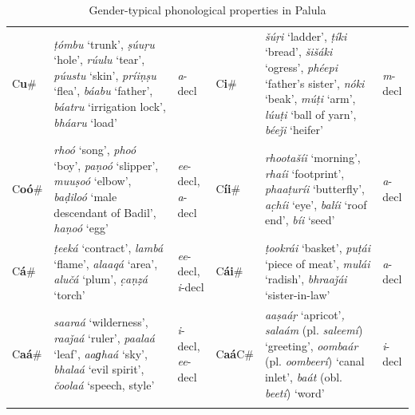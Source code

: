 \documentclass[output=collectionpaper]{langsci/langscibook}
\begin{document}
\begin{table}[htb]
\begin{tabularx}{\textwidth}{p{1cm}>{\raggedright\let\newline\\\arraybackslash\hspace{0pt}}Xp{1cm}p{1cm}>{\raggedright\let\newline\\\arraybackslash\hspace{0pt}}Xp{1cm}}
\lsptoprule
\multicolumn{3}{X}{Masculine} & \multicolumn{3}{X}{Feminine}\\
\midrule
C\textbf{u}\# & \textit{ṭómbu} `trunk', \textit{ṣúuṛu} `hole', \textit{rúulu} `tear', \textit{púustu} `skin', \textit{príiṇṣu} `flea', \textit{báabu} `father', \textit{báatru} `irrigation lock', \textit{bháaru} `load' & \textit{a}{}-decl & C\textbf{i}\# & \textit{šúṛi} `ladder', \textit{ṭíki} `bread', \textit{šišáki} `ogress', \textit{phéepi} `father's sister', \textit{nóki} `beak', \textit{múṭi} `arm', \textit{lúuṭi} `ball of yarn', \textit{béeǰi} `heifer' & \textit{m}{}-decl\\
C\textbf{oó}\# & \textit{rhoó} `song', \textit{phoó} `boy', \textit{paṇoó} `slipper', \textit{muuṣoó} `elbow', \textit{baḍiloó} `male descendant of Badil', \textit{haṇoó} `egg' & \textit{ee}{}-decl, \textit{a}{}-decl & C\textbf{íi}\# & \textit{rhootašíi} `morning', \textit{rhaíi} `footprint', \textit{phaaṭuríi} `butterfly', \textit{ac̣híi} `eye', \textit{balíi} `roof end', \textit{bíi} `seed' & \textit{a}{}-decl\\
C\textbf{á}\# & \textit{ṭeeká} `contract', \textit{lambá} `flame', \textit{alaaqá} `area', \textit{alučá} `plum', \textit{c̣aṇẓá} `torch' & \textit{ee}{}-decl, \textit{i}{}-decl & C\textbf{á}\textbf{i}\# & \textit{ṭookrái} `basket', \textit{puṭái} `piece of meat', \textit{mulái} `radish', \textit{bhraaǰái} `sister-in-law' & \textit{a}{}-decl\\
C\textbf{aá}\# & \textit{saaraá} `wilderness', \textit{raaǰaá} `ruler', \textit{paalaá} `leaf', \textit{aaɡhaá} `sky', \textit{bhalaá} `evil spirit', \textit{čoolaá} `speech, style' & \textit{i}{}-decl, \textit{ee}{}-decl & C\textbf{aá}C\# & \textit{aaṣaáṛ} `apricot'\textit{, salaám} (pl. \textit{saleemí}) `greeting', \textit{oombaár} (pl. \textit{oombeerí}) `canal inlet', \textit{baát} (obl. \textit{beetí}) `word' & \textit{i}{}-decl\\
\lspbottomrule
\end{tabularx}
\caption{Gender-typical phonological properties in Palula}
\label{tab:Lilje:8}
\end{table}
\end{document}
